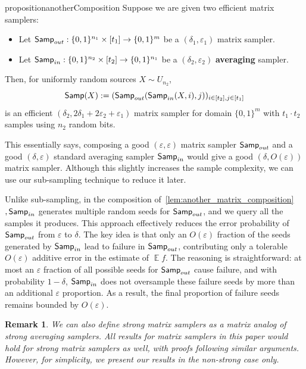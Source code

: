 \documentclass[10pt,a4paper]{article}
\newtheorem{remark}[theorem]{Remark}
\DeclareMathOperator*{\E}{\mathbb{E}}
\newcommand{\eps}{\varepsilon}
\newcommand{\1}{\mathbbm{1}}
\newcommand{\zo}{\{0, 1\}}
\newcommand{\Smp}{\textup{\textsf{Samp}}}
\begin{document}
\begin{restatable}{proposition}{anotherComposition}
\label{lem:another_matrix_composition}
    Suppose we are given two efficient matrix samplers:
\begin{itemize}
    \item  Let $\Smp_{out}: \zo^{n_1} \times [t_1] \to \zo^m$ be a $(\delta_1, \eps_1)$ matrix sampler.
    \item Let $\Smp_{in}: \zo^{n_2} \times [t_2] \to \zo^{n_1}$ be a $(\delta_2, \eps_2)$ \textbf{averaging} sampler.
\end{itemize}
 Then, for uniformly random sources  $X \sim U_{n_2}$, \[
        \Smp(X):= (\Smp_{out}(\Smp_{in}(X, i), j))_{i \in [t_2], j \in [t_1]}
    \]
    is an efficient $(\delta_2, 2\delta_1 + 2\eps_2 + \eps_1)$ matrix sampler for domain $\zo^m$ with $t_1 \cdot t_2$ samples using $n_2$ random bits. 
\end{restatable}

This essentially says, composing a good $(\eps, \eps)$ matrix sampler $\Smp_{out}$ and a good $(\delta, \eps)$ standard averaging sampler $\Smp_{in}$ would give a  good $(\delta, O(\eps))$ matrix sampler. Although this slightly increases the sample complexity, we can use our sub-sampling technique to reduce it later.

Unlike sub-sampling, in the composition of~\cref{lem:another_matrix_composition}$, \Smp_{in}$ generates multiple random seeds for $\Smp_{out}$, and we query all the samples it produces. This approach effectively reduces the error probability of $\Smp_{out}$ from $\eps$ to $\delta$. The key idea is that only an \(O(\eps)\) fraction of the seeds generated by \(\Smp_{in}\) lead to failure in \(\Smp_{out}\), contributing only a tolerable \(O(\eps)\) additive error in the estimate of \(\E f\).  The reasoning is straightforward: at most an \(\eps\) fraction of all possible seeds for \(\Smp_{out}\) cause failure, and with probability \(1 - \delta\), \(\Smp_{in}\) does not oversample these failure seeds by more than an additional \(\eps\) proportion. As a result, the final proportion of failure seeds remains bounded by \(O(\eps)\).






\begin{remark}
We can also define \emph{strong matrix samplers} as a matrix analog of strong averaging samplers. All results for matrix samplers in this paper would hold for strong matrix samplers as well, with proofs following similar arguments. However, for simplicity, we present our results in the non-strong case only.
\end{remark}
\end{document}

